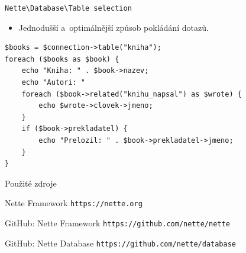 \documentclass[10pt, hyperref={unicode}]{beamer}
\begin{document}
\begin{frame}[fragile]{\texttt{Nette{\textbackslash}Database{\textbackslash}Table selection}}
	\begin{itemize}
		\item Jednodušší a~optimálnější způsob pokládání dotazů.
	\end{itemize}

\begin{lstlisting}[title={Výpis všech knih, jejich autorů a~překladatelů:}]
$books = $connection->table("kniha");
foreach ($books as $book) {
	echo "Kniha: " . $book->nazev;
	echo "Autori: "
	foreach ($book->related("knihu_napsal") as $wrote) {
		echo $wrote->clovek->jmeno;
	}
	if ($book->prekladatel) {
		echo "Prelozil: " . $book->prekladatel->jmeno;
	}
}
\end{lstlisting}
\end{frame}



\begin{frame}{Použité zdroje}
	\begin{thebibliography}{10}
		 Nette Framework
		\newblock \texttt{https://nette.org}

		 GitHub: Nette Framework
		\newblock \texttt{https://github.com/nette/nette}

		 GitHub: Nette Database
		\newblock \texttt{https://github.com/nette/database}
	\end{thebibliography}
\end{frame}
\end{document}
